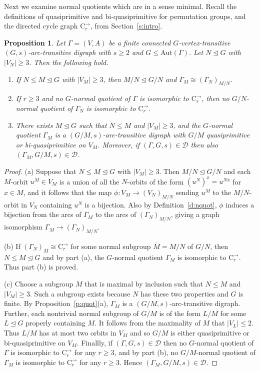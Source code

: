 \documentclass[11pt]{amsart}
\newtheorem{proposition}[theorem]{Proposition}
\newcommand{\Aut}{\mathrm{Aut}}
\newcommand{\C}{{\mathrm{C}}}
\newcommand\DD{{\mathscr{D}}}
\begin{document}
Next we examine normal quotients which are in a sense minimal. Recall the definitions of quasiprimitive and bi-quasiprimitive for permutation groups, and the directed cycle graph $\C^{\to}_r$,  from Section~\ref{s:intro}.

\begin{proposition}\label{p:quot2}
   Let \(\Gamma=(V,A)\) be a finite connected $G$-vertex-transitive \((G,s)\)-arc-transitive digraph with \(s\geqslant2\) and $G\leq\Aut(\Gamma)$. Let $N\unlhd G$ with $|V_N|\geq3$. Then the following hold.
   \begin{enumerate}
       \item[(a)] If  $N\leqslant M\unlhd G$ with $|V_M|\geqslant3$, then $M/N\unlhd G/N$ and $\Gamma_M\cong (\Gamma_N)_{M/N}$.
       \item[(b)] If $r\geqslant3$ and no $G$-normal quotient of $\Gamma$ is isomorphic to $\C^{\to}_r$, then  no $G/N$-normal quotient of $\Gamma_N$ is isomorphic to $\C^{\to}_r$.
       \item[(c)] There exists $M\unlhd G$ such that $N\leqslant M$ and $|V_M|\geqslant3$, and the $G$-normal quotient $\Gamma_M$ is a $(G/M,s)$-arc-transitive digraph with $G/M$ quasiprimitive or bi-quasiprimitive on $V_M$. Moreover, if $(\Gamma, G, s)\in\DD$ then also $(\Gamma_M, G/M, s)\in\DD$.
   \end{enumerate}
\end{proposition}

\begin{proof}
    (a) Suppose that $N\leqslant M\unlhd G$ with $|V_M|\geqslant3$. Then $M/N\unlhd G/N$ and each $M$-orbit $u^M\in V_M$ is a union of all the $N$-orbits of the form $(u^N)^x=u^{Nx}$ for $x\in M$, and it follows that the map $\phi:V_M\to (V_N)_{M/N}$ sending $u^M$ to the $M/N$-orbit in $V_N$ containing $u^N$ is a bijection. Also by Definition~\ref{d:nquot}, $\phi$ induces a bijection from the arcs of $\Gamma_M$ to the arcs of $(\Gamma_N)_{M/N}$, giving a graph isomorphism $\Gamma_M\to  (\Gamma_N)_{M/N}$.

    (b) If $(\Gamma_N)_{\overline{M}}\cong \C^{\to}_r$ for some normal subgroup $\overline{M}=M/N$ of $G/N$, then $N\leqslant M\unlhd G$ and by part (a), the $G$-normal quotient $\Gamma_M$ is isomorphic to $\C^{\to}_r$. Thus part (b) is proved.

    (c) Choose a subgroup $M$ that is maximal by inclusion such that $N\leqslant M$ and $|V_M|\geqslant 3$. Such a subgroup exists because $N$ has these two properties and $G$ is finite. By Proposition~\ref{p:quot}(a), $\Gamma_M$ is a $(G/M,s)$-arc-transitive digraph. Further, each nontrivial normal subgroup of $G/M$ is of the form $L/M$ for some $L\unlhd G$ properly containing $M$. It follows from the maximality of $M$ that $|V_L|\leq 2$. Thus $L/M$ has at most two orbits in $V_M$ and so $G/M$ is either quasiprimitive or bi-quasiprimitive on $V_M$.  Finallly,  if $(\Gamma, G, s)\in\DD$ then  no $G$-normal quotient of $\Gamma$ is isomorphic to $\C^{\to}_r$ for any $r\geq3$, and by part (b),  no $G/M$-normal quotient of $\Gamma_M$ is isomorphic to $\C^{\to}_r$ for any $r\geq3$. Hence $(\Gamma_M, G/M, s)\in\DD$.
\end{proof}
\end{document}
